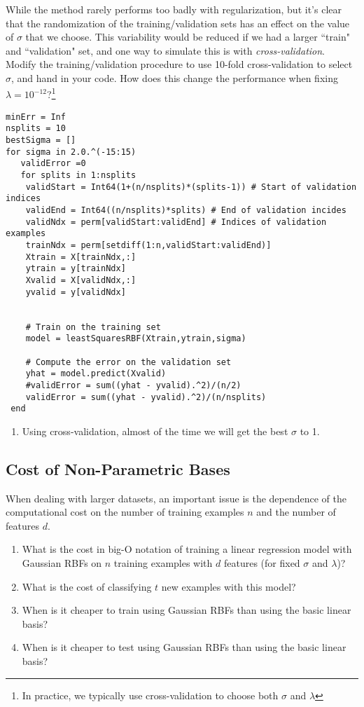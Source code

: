 \documentclass{article}
\def\blu#1{{\color{blu}#1}}
\def\enum#1{\begin{enumerate}#1\end{enumerate}}
\begin{document}
While the method rarely performs too badly with regularization, but it's clear that the randomization of the training/validation sets has an effect on the value of $\sigma$ that we choose. This variability would be reduced if we had a larger ``train" and ``validation" set, and one way to simulate this is with \emph{cross-validation}. \blu{Modify the training/validation procedure to use 10-fold cross-validation to select $\sigma$, and hand in your code. How does this change the performance when fixing $\lambda = 10^{-12}$?}\footnote{In practice, we typically use cross-validation to choose both $\sigma$ and $\lambda$}

\begin{verbatim}
minErr = Inf
nsplits = 10
bestSigma = []
for sigma in 2.0.^(-15:15)
   validError =0
   for splits in 1:nsplits
    validStart = Int64(1+(n/nsplits)*(splits-1)) # Start of validation indices
	validEnd = Int64((n/nsplits)*splits) # End of validation incides
	validNdx = perm[validStart:validEnd] # Indices of validation examples
	trainNdx = perm[setdiff(1:n,validStart:validEnd)] 
	Xtrain = X[trainNdx,:]
	ytrain = y[trainNdx]
	Xvalid = X[validNdx,:]
	yvalid = y[validNdx]


	# Train on the training set
	model = leastSquaresRBF(Xtrain,ytrain,sigma)

	# Compute the error on the validation set
	yhat = model.predict(Xvalid)
	#validError = sum((yhat - yvalid).^2)/(n/2)
    validError = sum((yhat - yvalid).^2)/(n/nsplits)
 end 
\end{verbatim}

\enum{
  \item Using cross-validation, almost of the time we will get the best $\sigma$ to 1.
}


\subsection{Cost of Non-Parametric Bases}

When dealing with larger datasets, an important issue is the dependence of the computational cost on the number of training examples $n$ and the number of features $d$. 
\blu{
\enum{
\item What is the cost in big-O notation of training a linear regression model with Gaussian RBFs on $n$ training examples with $d$ features (for fixed $\sigma$ and $\lambda$)? 
\item What is the cost of classifying $t$ new examples with this model? 
\item When is it cheaper to train using Gaussian RBFs than using the basic linear basis? 
\item When is it cheaper to test using Gaussian RBFs than using the basic linear basis?
}}
\end{document}
